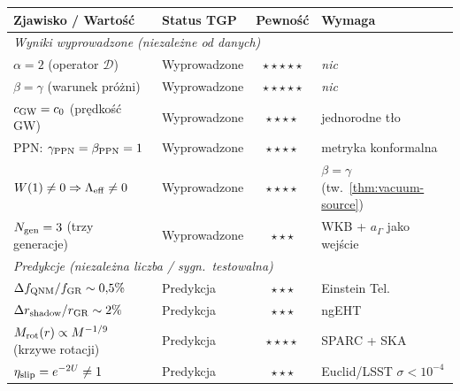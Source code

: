 \begin{center}\footnotesize
\begin{tabular}{@{}p{4.5cm}lcp{3.5cm}@{}}
\toprule
\textbf{Zjawisko / Warto\'s\'c} & \textbf{Status TGP}
  & \textbf{Pewno\'s\'c} & \textbf{Wymaga} \\
\midrule

\multicolumn{4}{l}{\textit{Wyniki wyprowadzone (niezale\.zne od danych)}} \\[2pt]

$\alpha = 2$ (operator $\mathcal{D}$)
  & Wyprowadzone & $\star\star\star\star\star$
  & \emph{nic} \\[3pt]

$\beta = \gamma$ (warunek pr\'o\.zni)
  & Wyprowadzone & $\star\star\star\star\star$
  & \emph{nic} \\[3pt]

$c_{\rm GW} = c_0$ (pr\k{e}dko\'s\'c GW)
  & Wyprowadzone & $\star\star\star\star$
  & jednorodne t\l{}o \\[3pt]

PPN: $\gamma_{\rm PPN} = \beta_{\rm PPN} = 1$
  & Wyprowadzone & $\star\star\star\star$
  & metryka konformalna \\[3pt]

$W(1) \neq 0 \Rightarrow \Lambda_{\rm eff} \neq 0$
  & Wyprowadzone & $\star\star\star\star$
  & $\beta = \gamma$ (tw.~\ref{thm:vacuum-source}) \\[3pt]

$N_{\rm gen} = 3$ (trzy generacje)
  & Wyprowadzone & $\star\star\star$
  & WKB + $a_\Gamma$ jako wej\'scie \\[8pt]

\multicolumn{4}{l}{\textit{Predykcje (niezale\.zna liczba / sygn.~testowalna)}} \\[2pt]

$\Delta f_{\rm QNM}/f_{\rm GR} \sim 0{,}5\%$
  & Predykcja & $\star\star\star$
  & Einstein Tel. \\[3pt]

$\Delta r_{\rm shadow}/r_{\rm GR} \sim 2\%$
  & Predykcja & $\star\star\star$
  & ngEHT \\[3pt]

$M_{\rm rot}(r) \propto M^{-1/9}$ (krzywe rotacji)
  & Predykcja & $\star\star\star\star$
  & SPARC + SKA \\[3pt]

$\eta_{\rm slip} = e^{-2U} \neq 1$
  & Predykcja & $\star\star\star$
  & Euclid/LSST $\sigma < 10^{-4}$ \\[3pt]


\end{tabular}
\end{center}
